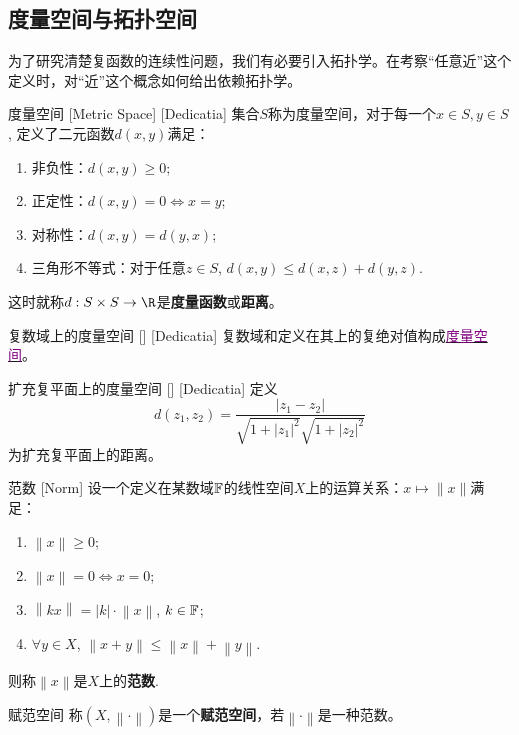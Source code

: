 \documentclass[UTF8]{ctexart}
\newcommand{\hyperrefc}[2]{\hyperref[#1]{\textcolor{purple}{#2}}}
\begin{document}
\subsection{度量空间与拓扑空间}
为了研究清楚复函数的连续性问题，我们有必要引入拓扑学。在考察“任意近”这个定义时，对“近”这个概念如何给出依赖拓扑学。
\begin{dfn}
    [MetricSpace]
    {度量空间}
    [Metric Space]
    [Dedicatia]
    集合$S$称为度量空间，对于每一个$x\in S, y\in S$, 定义了二元函数$d(x,y)$满足：
    \begin{enumerate}
        \item 非负性：$d(x,y)\geqslant 0$;
        \item 正定性：$d(x,y)=0\Longleftrightarrow x=y$;
        \item 对称性：$d(x,y)=d(y,x)$;
        \item 三角形不等式：对于任意$z\in S$, $d(x,y)\leqslant d(x,z)+d(y,z)$.
    \end{enumerate}
    这时就称$d:S\times S\to \R$是\textbf{度量函数}或\textbf{距离}。
\end{dfn}
\begin{xmp}
    [UUID]
    {复数域上的度量空间}
    []
    [Dedicatia]
    复数域和定义在其上的复绝对值构成\hyperrefc{dfn:MetricSpace}{度量空间}。
\end{xmp}
\begin{xmp}
    [UUID]
    {扩充复平面上的度量空间}
    []
    [Dedicatia]
    定义
    \[d(z_1,z_2)=\frac{|z_1-z_2|}{\sqrt{1+|z_1|^2}\sqrt{1+|z_2|^2}}\]
    为扩充复平面上的距离。
\end{xmp}
\begin{dfn}
    {范数}
    [Norm]
    设一个定义在某数域$\operatorname{\mathbb{F}}$的线性空间$X$上的运算关系：$x\mapsto\lVert x\rVert$满足：
    \begin{enumerate}
        \item $\left\lVert x\right\rVert\geq 0$;
        \item $\left\lVert x\right\rVert=0\Longleftrightarrow x=0$;
        \item $\left\lVert kx\right\rVert=|k|\cdot\left\lVert x\right\rVert $, $k\in\operatorname{\mathbb{F}}$;
        \item $\forall y\in X$, $\left\lVert x+y\right\rVert\leq\left\lVert x\right\rVert+\left\lVert y\right\rVert   $. 
    \end{enumerate}
    则称$\left\lVert x\right\rVert $是$X$上的\textbf{范数}.
\end{dfn}
\begin{dfn}
    {赋范空间}
    称$(X,\left\lVert \cdot\right\rVert )$是一个\textbf{赋范空间}，若$\left\lVert \cdot\right\rVert $是一种范数。
\end{dfn}
\end{document}
